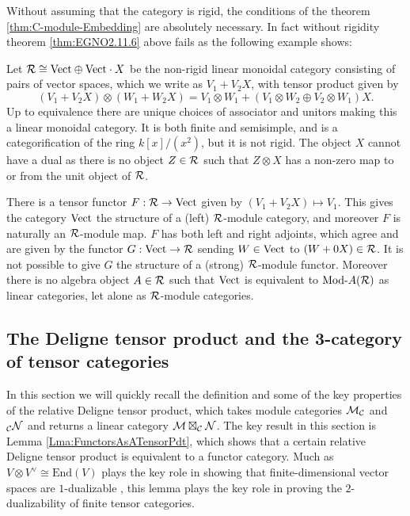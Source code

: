 \documentclass{amsart}
\begin{document}
Without assuming that the category is rigid, the conditions of the theorem \ref{thm:C-module-Embedding} are absolutely necessary. In fact without rigidity theorem \ref{thm:EGNO2.11.6} above fails as the following example shows: 

\begin{example} \label{ex:lax-module}
	Let $\mathcal R \cong \mathrm{Vect} \oplus \mathrm{Vect} \cdot X$ be the non-rigid linear monoidal category consisting of pairs of vector spaces, which we write as $V_1 + V_2 X$, with tensor product given by 
	\begin{equation*}
		(V_1 + V_2 X) \otimes (W_1 + W_2 X) = V_1 \otimes W_1  +  (V_1 \otimes W_2 \oplus V_2 \otimes W_1)X.
	\end{equation*} 
	Up to equivalence there are unique choices of associator and unitors making this a linear monoidal category. 
It is both finite and semisimple, and is a categorification of the ring $k[x]/(x^2)$, but it is not rigid. The object $X$ cannot have a dual as there is no object $Z \in \mathcal R$ such that $Z \otimes X$ has a non-zero map to or from the unit object of $\mathcal R$. 
	
	There is a tensor functor $F:\mathcal R \to \mathrm{Vect}$ given by $(V_1 + V_2 X) \mapsto V_1$. This gives the category $\mathrm{Vect}$ the structure of a (left) $\mathcal R$-module category, and moreover $F$ is naturally an $\mathcal R$-module map. $F$ has both left and right adjoints, which agree and are given by the functor $G: \mathrm{Vect} \to \mathcal R$ sending $W \in \mathrm{Vect}$ to $(W + 0 X) \in \mathcal R$. It is not possible to give $G$ the structure of a (strong) $\mathcal R$-module functor. Moreover there is no algebra object $A \in \mathcal R$ such that $\mathrm{Vect}$ is equivalent to $\Mod{}{A}(\cR)$ as linear categories, let alone as $\mathcal R$-module categories. 
\end{example}




\subsection{The Deligne tensor product and the 3-category of tensor categories} \label{sec:tc-deligne}

In this section we will quickly recall the definition and some of the key properties of the relative Deligne tensor product, which takes module categories $\mathcal M_\mathcal C$ and ${}_\mathcal C \mathcal N$ and returns a linear category $\mathcal M \boxtimes_\mathcal C \mathcal N$.  The key result in this section is Lemma \ref{Lma:FunctorsAsATensorPdt}, which shows that a certain relative Deligne tensor product is equivalent to a functor category.  Much as $V \otimes V^\vee \cong \mathrm{End}(V)$ plays the key role in showing that finite-dimensional vector spaces are $1$-dualizable \cite[Ex. 1.1.9]{lurie-ch}, this lemma plays the key role in proving the $2$-dualizability of finite tensor categories.
\end{document}
